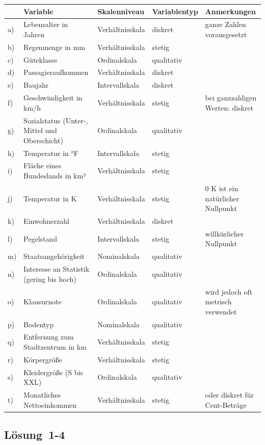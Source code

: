\documentclass[
  11pt,
  ngerman,
  a4paper,
]{report}
\begin{document}
\begin{table}[H]
\centering
\begin{tabular}{lllll}
\toprule
\textbf{ } & \textbf{Variable} & \textbf{Skalenniveau} & \textbf{Variablentyp} & \textbf{Anmerkungen}\\
\midrule
a) & Lebensalter in Jahren & Verhältnisskala & diskret & ganze Zahlen vorausgesetzt\\
b) & Regenmenge in mm & Verhältnisskala & stetig & \\
c) & Güteklasse & Ordinalskala & qualitativ & \\
d) & Passagieraufkommen & Verhältnisskala & diskret & \\
e) & Baujahr & Intervallskala & diskret & \\
f) & Geschwindigkeit in km/h & Verhältnisskala & stetig & bei ganzzahligen Werten: diskret\\
g) & Sozialstatus (Unter-, Mittel und Oberschicht) & Ordinalskala & qualitativ & \\
h) & Temperatur in °F & Intervallskala & stetig & \\
i) & Fläche eines Bundeslands in km² & Verhältnisskala & stetig & \\
j) & Temperatur in K & Verhältnisskala & stetig & 0 K ist ein natürlicher Nullpunkt\\
k) & Einwohnerzahl & Verhältnisskala & diskret & \\
l) & Pegelstand & Intervallskala & stetig & willkürlicher Nullpunkt\\
m) & Staatsangehörigkeit & Nominalskala & qualitativ & \\
n) & Interesse an Statistik (gering bis hoch) & Ordinalskala & qualitativ & \\
o) & Klausurnote & Ordinalskala & qualitativ & wird jedoch oft metrisch verwendet\\
p) & Bodentyp & Nominalskala & qualitativ & \\
q) & Entfernung zum Stadtzentrum in km & Verhältnisskala & stetig & \\
r) & Körpergröße & Verhältnisskala & stetig & \\
s) & Kleidergröße (S bis XXL) & Ordinalskala & qualitativ & \\
t) & Monatliches Nettoeinkommen & Verhältnisskala & stetig & oder diskret für Cent-Beträge\\
\bottomrule
\end{tabular}
\end{table}

\hypertarget{loesung-1-4}{%
\subsection{Lösung~1-4}\label{loesung-1-4}}
\end{document}
